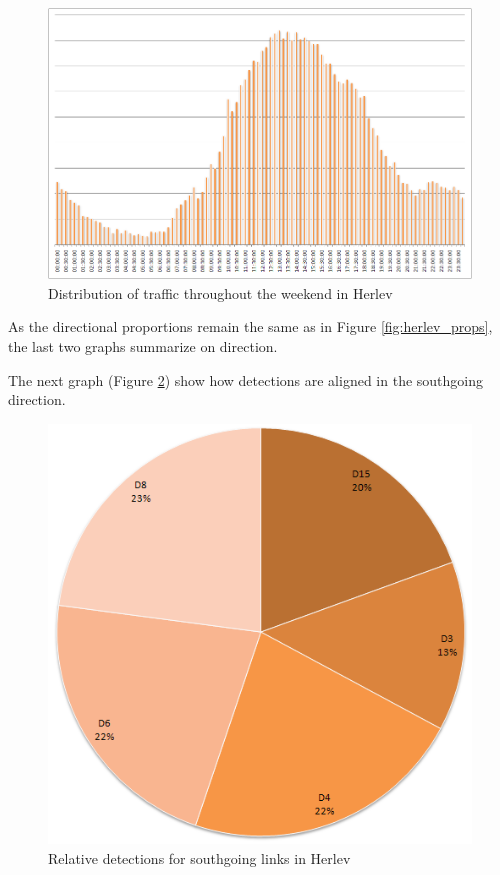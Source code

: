 \begin{figure}[!ht]
\begin{center}
\includegraphics[scale=0.4]{herlev_weekend_distribution.png} 
\end{center}
\caption{Distribution of traffic throughout the weekend in Herlev}
\label{fig:herlev_weekends}
\end{figure}

As the directional proportions remain the same as in Figure \ref{fig:herlev_props}, the last two graphs summarize on direction.

The next graph (Figure \ref{fig:herlev_southgoing}) show how detections are aligned in the southgoing direction. 

\begin{figure}[!ht]
\begin{center}
\includegraphics[scale=0.4]{herlev_southgoing_detectors.png} 
\end{center}
\caption{Relative detections for southgoing links in Herlev}
\label{fig:herlev_southgoing}
\end{figure}

